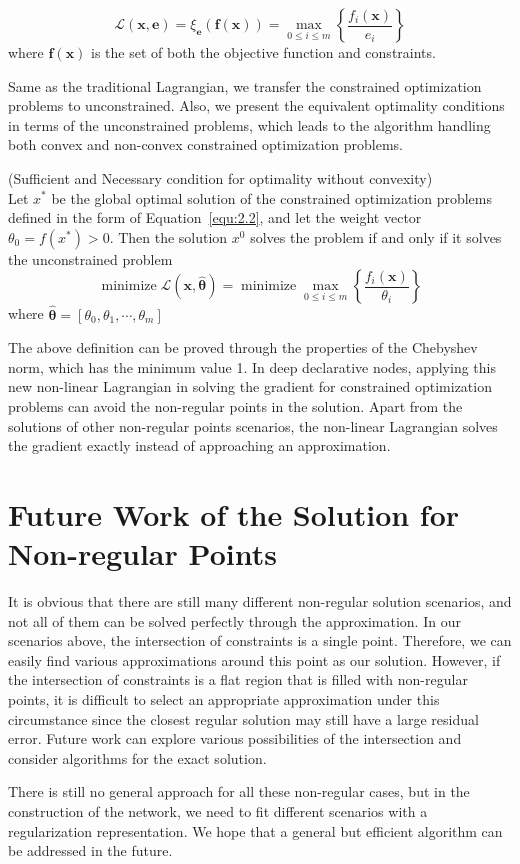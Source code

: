 \begin{equation}
    \label{equ:non-linear-lag}
    \mathcal{L}(\mathbf{x}, \mathbf{e})=\xi_{\mathbf{e}}(\mathbf{f}(\mathbf{x}))=\max _{0 \leq i \leq m}\left\{\frac{f_{i}(\mathbf{x})}{e_{i}}\right\}
\end{equation}
where $\mathbf{f}(\mathbf{x})$ is the set of both the objective function and constraints. 
\par Same as the traditional Lagrangian, we transfer the constrained optimization problems to unconstrained. Also, we present the equivalent optimality conditions in terms of the unconstrained problems, which leads to the algorithm handling both convex and non-convex constrained optimization problems. 
\begin{defn}{(Sufficient and Necessary condition for optimality without convexity)}
    \\
    Let $x^*$ be the global optimal solution of the constrained optimization problems defined in the form of Equation~\ref{equ:2.2}, and let the weight vector $\theta_0 = f(x^*) > 0$. Then the solution $x^0$ solves the problem if and only if it solves the unconstrained problem
    $$
        \operatorname{minimize} \mathcal{L}(\mathbf{x}, \hat{\boldsymbol{\theta}}) = \operatorname{minimize} \max _{0 \leq i \leq m}\left\{\frac{f_{i}(\mathbf{x})}{\theta_{i}}\right\}
    $$
    where $\hat{\boldsymbol{\theta}}=\left[\theta_{0}, \theta_{1}, \cdots, \theta_{m}\right]$
\end{defn}
\par The above definition can be proved through the properties of the Chebyshev norm, which has the minimum value 1. In deep declarative nodes, applying this new non-linear Lagrangian in solving the gradient for constrained optimization problems can avoid the non-regular points in the solution. Apart from the solutions of other non-regular points scenarios, the non-linear Lagrangian solves the gradient exactly instead of approaching an approximation. 

\section{Future Work of the Solution for Non-regular Points}
\label{sec:futurework-non}
It is obvious that there are still many different non-regular solution scenarios, and not all of them can be solved perfectly through the approximation. In our scenarios above, the intersection of constraints is a single point. Therefore, we can easily find various approximations around this point as our solution. However, if the intersection of constraints is a flat region that is filled with non-regular points, it is difficult to select an appropriate approximation under this circumstance since the closest regular solution may still have a large residual error. Future work can explore various possibilities of the intersection and consider algorithms for the exact solution.
\par There is still no general approach for all these non-regular cases, but in the construction of the network, we need to fit different scenarios with a regularization representation. We hope that a general but efficient algorithm can be addressed in the future. 
